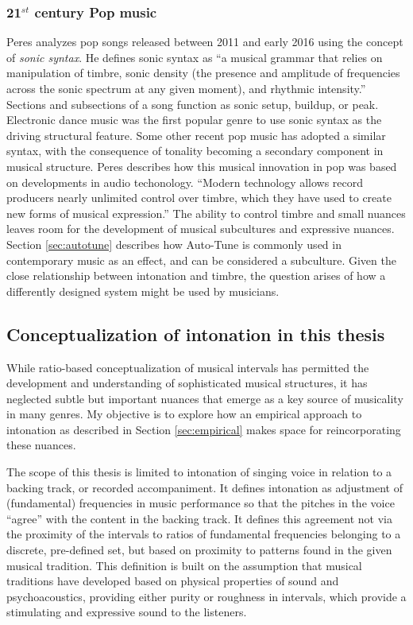 \subsubsection{21$^{st}$ century Pop music}
Peres analyzes pop songs released between 2011 and early 2016 using the concept of \textit{sonic syntax}. He defines sonic syntax as ``a musical grammar that relies on manipulation of timbre, sonic
density (the presence and amplitude of frequencies across the sonic spectrum at any given
moment), and rhythmic intensity.'' \cite[][p.~2]{peres2016sonic} Sections and subsections of a song function as sonic setup, buildup, or peak. Electronic dance music was the first popular genre to use sonic syntax as the driving structural feature. Some other recent pop music has adopted a similar syntax, with the consequence of tonality becoming a secondary component in musical structure. Peres describes how this musical innovation in pop was based on developments in audio techonology. ``Modern technology allows record producers nearly unlimited control over timbre, which they have used to create new forms of musical expression.'' \cite[][p.~36]{peres2016sonic} The ability to control timbre and small nuances leaves room for the development of musical subcultures and expressive nuances. Section \ref{sec:autotune} describes how Auto-Tune is commonly used in contemporary music as an effect, and can be considered a subculture. Given the close relationship between intonation and timbre, the question arises of how a differently designed system might be used by musicians.

\subsection{Conceptualization of intonation in this thesis}

While ratio-based conceptualization of musical intervals has permitted the development and understanding of sophisticated musical structures, it has neglected subtle but important nuances that emerge as a key source of musicality in many genres. My objective is to explore how an empirical approach to intonation as described in Section \ref{sec:empirical} makes space for reincorporating these nuances. 

The scope of this thesis is limited to intonation of singing voice in relation to a backing track, or recorded accompaniment. It defines intonation as adjustment of (fundamental) frequencies in music performance so that the pitches in the voice ``agree'' with the content in the backing track. It defines this agreement not via the proximity of the intervals to ratios of fundamental frequencies belonging to a discrete, pre-defined set, but based on proximity to patterns found in the given musical tradition. This definition is built on the assumption that musical traditions have developed based on physical properties of sound and psychoacoustics, providing either purity or roughness in intervals, which provide a stimulating and expressive sound to the listeners. 

